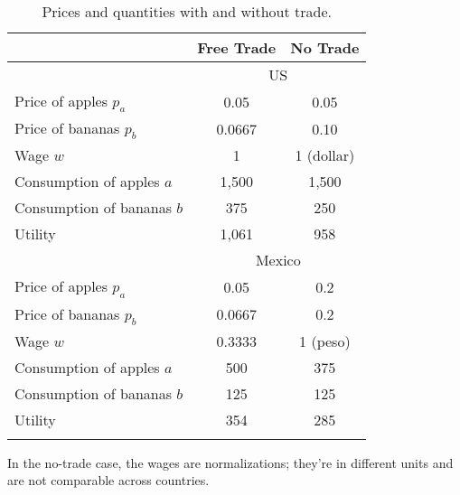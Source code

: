 \begin{table}[ht]
\caption{Prices and quantities with and without trade.}
\label{tab:price_quant}
\centering
\begin{tabular*}{0.8\textwidth}{l@{\extracolsep{\fill}}cc}
\toprule
                                  &      Free Trade     &    No Trade    \\%
\midrule
                                  & \multicolumn{2}{c}{US} \\
\midrule%
Price of apples $p_{a}$           &         0.05        &      0.05      \\%
%
Price of bananas $p_{b}$          &         0.0667      &      0.10      \\%
%
Wage $w$                          &          1          &      1 (dollar)      \\%
%
Consumption of apples $a$         &          1,500      &      1,500      \\%
%
Consumption of bananas $b$        &          375        &     250      \\%
%
Utility                           &          1,061      &      958      \\%
\midrule
                                  & \multicolumn{2}{c}{Mexico} \\
\midrule%
Price of apples $p_{a}$           &         0.05        &      0.2      \\%
%
Price of bananas $p_{b}$          &          0.0667     &      0.2      \\%
%
Wage $w$                          &          0.3333     &      1 (peso)      \\%
%
Consumption of apples $a$         &          500        &      375      \\%
%
Consumption of bananas $b$        &          125       &       125      \\%
Utility                           &          354       &       285      \\%
\bottomrule
\addlinespace
\end{tabular*}
\begin{minipage}{0.8\textwidth}
\footnotesize{In the no-trade case, the wages are normalizations;
they're in different units and are not comparable across countries.}
\end{minipage}
\end{table}





